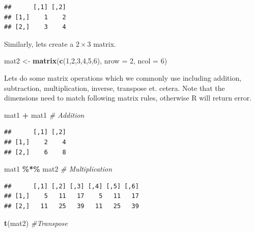\documentclass[
]{article}
\newenvironment{Shaded}{\begin{snugshade}}{\end{snugshade}}
\newcommand{\AttributeTok}[1]{\textcolor[rgb]{0.13,0.29,0.53}{#1}}
\newcommand{\CommentTok}[1]{\textcolor[rgb]{0.56,0.35,0.01}{\textit{#1}}}
\newcommand{\DecValTok}[1]{\textcolor[rgb]{0.00,0.00,0.81}{#1}}
\newcommand{\FunctionTok}[1]{\textcolor[rgb]{0.13,0.29,0.53}{\textbf{#1}}}
\newcommand{\NormalTok}[1]{#1}
\newcommand{\OtherTok}[1]{\textcolor[rgb]{0.56,0.35,0.01}{#1}}
\newcommand{\SpecialCharTok}[1]{\textcolor[rgb]{0.81,0.36,0.00}{\textbf{#1}}}
\begin{document}
\begin{verbatim}
##      [,1] [,2]
## [1,]    1    2
## [2,]    3    4
\end{verbatim}

Similarly, lets create a \(2\times3\) matrix.

\begin{Shaded}
\begin{Highlighting}[]
\NormalTok{mat2 }\OtherTok{\textless{}{-}} \FunctionTok{matrix}\NormalTok{(}\FunctionTok{c}\NormalTok{(}\DecValTok{1}\NormalTok{,}\DecValTok{2}\NormalTok{,}\DecValTok{3}\NormalTok{,}\DecValTok{4}\NormalTok{,}\DecValTok{5}\NormalTok{,}\DecValTok{6}\NormalTok{), }\AttributeTok{nrow =} \DecValTok{2}\NormalTok{, }\AttributeTok{ncol =} \DecValTok{6}\NormalTok{)}
\end{Highlighting}
\end{Shaded}

Lets do some matrix operations which we commonly use including addition,
subtraction, multiplication, inverse, transpose et. cetera. Note that
the dimensions need to match following matrix rules, otherwise R will
return error.

\begin{Shaded}
\begin{Highlighting}[]
\NormalTok{mat1 }\SpecialCharTok{+}\NormalTok{ mat1 }\CommentTok{\# Addition}
\end{Highlighting}
\end{Shaded}

\begin{verbatim}
##      [,1] [,2]
## [1,]    2    4
## [2,]    6    8
\end{verbatim}

\begin{Shaded}
\begin{Highlighting}[]
\NormalTok{mat1 }\SpecialCharTok{\%*\%}\NormalTok{ mat2 }\CommentTok{\# Multiplication}
\end{Highlighting}
\end{Shaded}

\begin{verbatim}
##      [,1] [,2] [,3] [,4] [,5] [,6]
## [1,]    5   11   17    5   11   17
## [2,]   11   25   39   11   25   39
\end{verbatim}

\begin{Shaded}
\begin{Highlighting}[]
\FunctionTok{t}\NormalTok{(mat2)     }\CommentTok{\#Transpose}
\end{Highlighting}
\end{Shaded}
\end{document}
